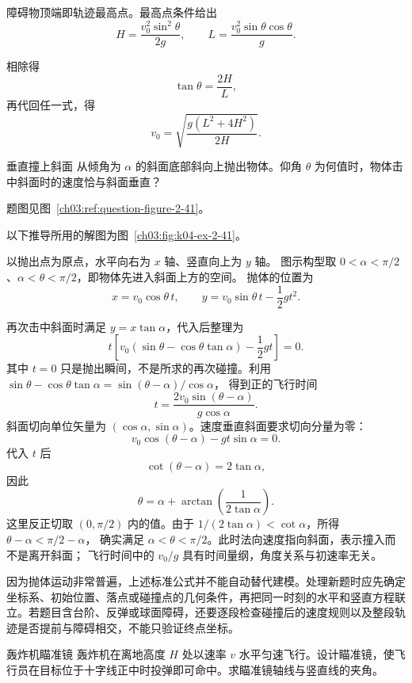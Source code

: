 {\begin{xesolution}
障碍物顶端即轨迹最高点。最高点条件给出
\[
H=\frac{v_0^2\sin^2\theta}{2g},\qquad
L=\frac{v_0^2\sin\theta\cos\theta}{g}.
\]
\HorizontalAtObstacleDiagram

相除得
\[
 \boxed{\tan\theta=\frac{2H}{L}},
\]
再代回任一式，得
\[
 \boxed{v_0=\sqrt{\frac{g(L^2+4H^2)}{2H}}}.
\]
\end{xesolution}

\begin{origexamplebox}{垂直撞上斜面}\label{ch03:ex:k04-2-41}
从倾角为 $\alpha$ 的斜面底部斜向上抛出物体。仰角 $\theta$ 为何值时，物体击中斜面时的速度恰与斜面垂直？
\par 题图见图~\ref{ch03:ref:question-figure-2-41}。
\KQuestionBP
\end{origexamplebox}
\begin{xesolution}
以下推导所用的解图为图~\ref{ch03:fig:k04-ex-2-41}。

以抛出点为原点，水平向右为 $x$ 轴、竖直向上为 $y$ 轴。
图示构型取 $0<\alpha<\pi/2$、$\alpha<\theta<\pi/2$，即物体先进入斜面上方的空间。
抛体的位置为
\[
 x=v_0\cos\theta\,t,\qquad y=v_0\sin\theta\,t-\frac12gt^2.
\]
\InclinedPlaneNormalImpactDiagram

再次击中斜面时满足 $y=x\tan\alpha$，代入后整理为
\[
 t\left[v_0(\sin\theta-\cos\theta\tan\alpha)-\frac12gt\right]=0.
\]
其中 $t=0$ 只是抛出瞬间，不是所求的再次碰撞。利用
$\sin\theta-\cos\theta\tan\alpha=\sin(\theta-\alpha)/\cos\alpha$，
得到正的飞行时间
\[
t=\frac{2v_0\sin(\theta-\alpha)}{g\cos\alpha}.
\]
斜面切向单位矢量为 $(\cos\alpha,\sin\alpha)$。速度垂直斜面要求切向分量为零：
\[
v_0\cos(\theta-\alpha)-gt\sin\alpha=0.
\]
代入 $t$ 后
\[
\cot(\theta-\alpha)=2\tan\alpha,
\]
因此
\[
 \boxed{\theta=\alpha+\arctan\!\left(\frac{1}{2\tan\alpha}\right)}.
\]
这里反正切取 $(0,\pi/2)$ 内的值。由于
$1/(2\tan\alpha)<\cot\alpha$，所得 $\theta-\alpha<\pi/2-\alpha$，
确实满足 $\alpha<\theta<\pi/2$。此时法向速度指向斜面，表示撞入而不是离开斜面；
飞行时间中的 $v_0/g$ 具有时间量纲，角度关系与初速率无关。
\end{xesolution}

因为抛体运动非常普遍，上述标准公式并不能自动替代建模。处理新题时应先确定坐标系、初始位置、落点或碰撞点的几何条件，再把同一时刻的水平和竖直方程联立。若题目含台阶、反弹或球面障碍，还要逐段检查碰撞后的速度规则以及整段轨迹是否提前与障碍相交，不能只验证终点坐标。


\begin{origexamplebox}{轰炸机瞄准镜}\label{ch03:ex:k04-2-42}
轰炸机在离地高度 $H$ 处以速率 $v$ 水平匀速飞行。设计瞄准镜，使飞行员在目标位于十字线正中时投弹即可命中。求瞄准镜轴线与竖直线的夹角。


\end{origexamplebox}}
